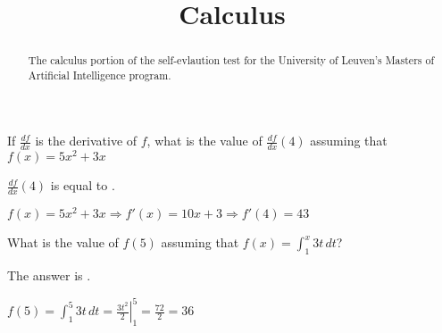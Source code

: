 \documentclass{ximera}
\title{Calculus}
\begin{document}
\begin{abstract}
The calculus portion of the self-evlaution test for the University of
Leuven's Masters of Artificial Intelligence program.
\end{abstract}
\maketitle

\begin{question}
If $\frac{df}{dx}$ is the derivative of $f$, what is the value of
$\frac{df}{dx}(4)$ assuming that $f(x) = 5x^2 +3x$

\begin{solution}
$\frac{df}{dx}(4)$ is equal to .
\end{solution}
$f(x) = 5x^2 + 3x \Rightarrow f'(x) = 10 x + 3 \Rightarrow f'(4) = 43$
\end{question}

\begin{question}
What is the value of $f(5) $ assuming that $f(x) = \int_1^x 3t \,dt$?
\begin{solution}
The answer is .
\end{solution}
$f(5) = \int_1^5 3t \,dt = \left. \frac{3t^2}{2} \right|_1^5 =
\frac{72}{2} = 36$
\end{question}
\end{document}
